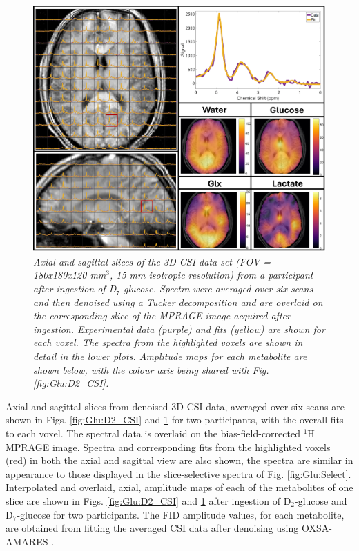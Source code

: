 \begin{figure}
    \centering
    \includegraphics[width = 1\textwidth]{Figures/Glucose/D7_CSI.png}
    \caption{\textit{Axial and sagittal slices of the 3D \ac{CSI} data set (\ac{FOV} = 180x180x120 mm$^3$, 15 mm isotropic resolution) from a participant after ingestion of D$_7$-glucose. Spectra were averaged over six scans and then denoised using a Tucker decomposition and are overlaid on the corresponding slice of the \ac{MPRAGE} image acquired after ingestion. Experimental data (purple) and fits (yellow) are shown for each voxel. The spectra from the highlighted voxels are shown in detail in the lower plots. Amplitude maps for each metabolite are shown below, with the colour axis being shared with Fig. \ref{fig:Glu:D2_CSI}.}}
    \label{fig:Glu:D7_CSI}
\end{figure}

Axial and sagittal slices from denoised 3D \ac{CSI} data, averaged over six scans are shown in Figs. \ref{fig:Glu:D2_CSI} and \ref{fig:Glu:D7_CSI} for two participants, with the overall fits to each voxel. The spectral data is overlaid on the bias-field-corrected $^1$H \ac{MPRAGE} image. Spectra and corresponding fits from the highlighted voxels (red) in both the axial and sagittal view are also shown, the spectra are similar in appearance to those displayed in the slice-selective spectra of Fig. \ref{fig:Glu:Select}. Interpolated and overlaid, axial, amplitude maps of each of the metabolites of one slice are shown in Figs. \ref{fig:Glu:D2_CSI} and \ref{fig:Glu:D7_CSI} after ingestion of D$_2$-glucose and D$_7$-glucose for two participants. The \ac{FID} amplitude values, for each metabolite, are obtained from fitting the averaged \ac{CSI} data after denoising using OXSA-AMARES \cite{Vanhamme1997ImprovedKnowledge, Purvis2017OXSA:MATLAB}.

